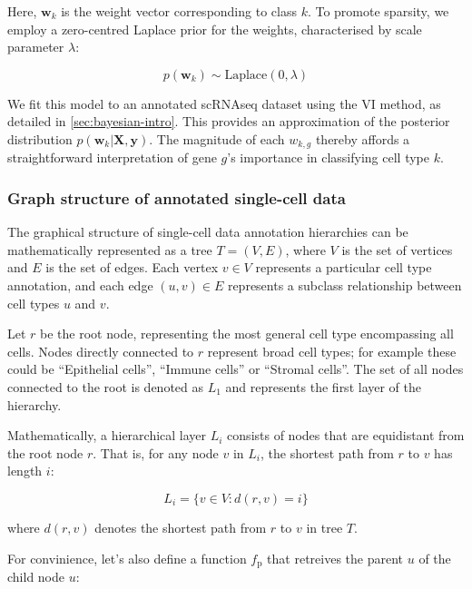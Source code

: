 Here, $\mathbf{w}_k$ is the weight vector corresponding to class $k$. To promote sparsity, we employ a zero-centred Laplace prior for the weights, characterised by scale parameter $\lambda$:

\begin{equation}
    \label{eq:logistic-regression-prior}
    p(\mathbf{w}_k) \sim \text{Laplace}(0, \lambda)
\end{equation}

We fit this model to an annotated \ac{scRNAseq} dataset using the \ac{VI} method, as detailed in \cref{sec:bayesian-intro}. This provides an approximation of the posterior distribution $p(\mathbf{w}_k | \mathbf{X}, \mathbf{y})$. The magnitude of each $w_{k,g}$ thereby affords a straightforward interpretation of gene $g$'s importance in classifying cell type $k$.

\subsubsection*{Graph structure of annotated single-cell data}

The graphical structure of single-cell data annotation hierarchies can be mathematically represented as a tree $T = (V, E)$, where $V$ is the set of vertices and $E$ is the set of edges. Each vertex $v \in V$ represents a particular cell type annotation, and each edge $(u, v) \in E$ represents a subclass relationship between cell types $u$ and $v$. 

Let $r$ be the root node, representing the most general cell type encompassing all cells. Nodes directly connected to $r$ represent broad cell types; for example these could be ``Epithelial cells'', ``Immune cells'' or ``Stromal cells''. The set of all nodes connected to the root is denoted as $L_1$ and represents the first layer of the hierarchy. 

Mathematically, a hierarchical layer $L_i$ consists of nodes that are equidistant from the root node $r$. That is, for any node $v$ in $L_i$, the shortest path from $r$ to $v$ has length $i$:

\begin{equation}
    L_i = \{v \in V : d(r, v) = i\}
\end{equation}

where $d(r,v)$ denotes the shortest path from $r$ to $v$ in tree $T$. 

For convinience, let's also define a function $f_{\text{p}}$ that retreives the parent $u$ of the child node $u$:

